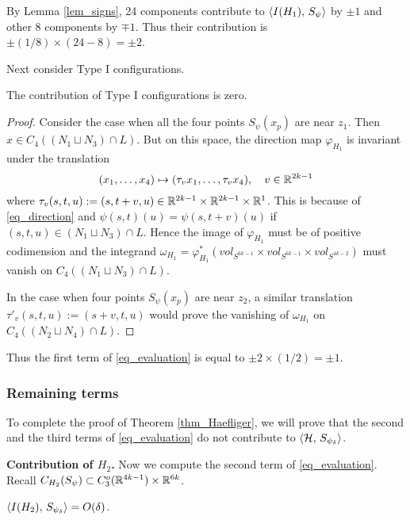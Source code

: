 By Lemma \ref{lem_signs}, 24 components contribute to $\langle {I(H_1 )},\, {S_{\psi}}\rangle$ by $\pm 1$ and other 8 components
by $\mp 1$.
Thus their contribution is $\pm (1/8)\times (24-8) =\pm 2$.


Next consider Type I configurations.


\begin{lem}\label{lem_dim_reason}
The contribution of Type I configurations is zero.
\end{lem}


\begin{proof}
Consider the case when all the four points $S_{\psi}(x_p )$ are near $z_1$.
Then $x\in C_4 ((N_1 \sqcup N_3 )\cap L)$.
But on this space, the direction map $\varphi_{H_1}$ is invariant under the translation
\[
 (x_1 ,\dots ,x_4 ) \mapsto (\tau_v x_1 ,\dots ,\tau_v x_4 ),\quad v\in \mathbb{R}^{2k-1}
\]
where $\tau_v (s,t,u):=(s,t+v,u)\in \mathbb{R}^{2k-1}\times \mathbb{R}^{2k-1}\times \mathbb{R}^1$.
This is because of \eqref{eq_direction} and $\psi (s,t)(u)=\psi (s,t+v)(u)$ if $(s,t,u)\in (N_1 \sqcup N_3 )\cap L$.
Hence the image of $\varphi_{H_1}$ must be of positive codimension and the integrand
$\omega_{H_1}=\varphi^*_{H_1} (vol_{S^{6k-1}}\times vol_{S^{6k-1}}\times vol_{S^{4k-2}})$ must vanish on
$C_4 ((N_1 \sqcup N_3 )\cap L)$.


In the case when four points $S_{\psi}(x_p )$ are near $z_2$, a similar translation $\tau'_v (s,t,u):=(s+v,t,u)$
would prove the vanishing of $\omega_{H_1}$ on $C_4 ((N_2 \sqcup N_4 )\cap L)$.
\end{proof}


Thus the first term of \eqref{eq_evaluation} is equal to $\pm 2 \times (1/2)=\pm 1$.





\subsubsection{Remaining terms}\label{sssec_remaining}
To complete the proof of Theorem \ref{thm_Haefliger}, we will prove that the second and the third terms of
\eqref{eq_evaluation} do not contribute to $\langle {\mathcal{H}},\, {S_{\psi_{\delta}}}\rangle$.


\noindent
{\bf Contribution of $H_2$.}
Now we compute the second term of \eqref{eq_evaluation}.
Recall $C_{H_2}(S_{\psi}) \subset C^o_3 (\mathbb{R}^{4k-1})\times \mathbb{R}^{6k}$.


\begin{lem}\label{lem_ev_H2}
$\langle {I(H_2 )},\, {S_{\psi_{\delta}}}\rangle=O(\delta )$.
\end{lem}


